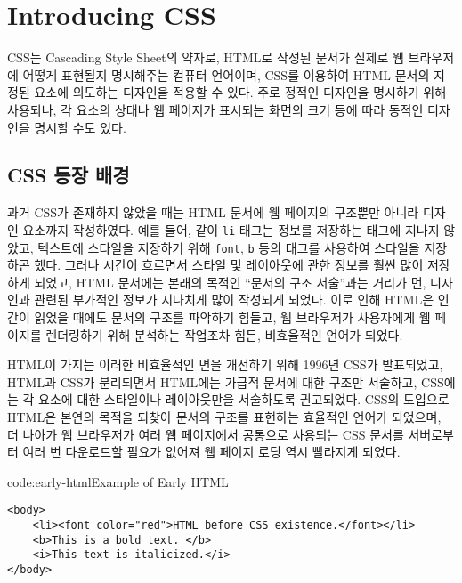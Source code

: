 \section{Introducing CSS} \label{sect:introducing-css}

CSS는 Cascading Style Sheet의 약자로, HTML로 작성된 문서가 실제로 웹 브라우저에 어떻게 표현될지 명시해주는 컴퓨터 언어이며, CSS를 이용하여 HTML 문서의 지정된 요소에 의도하는 디자인을 적용할 수 있다. 주로 정적인 디자인을 명시하기 위해 사용되나, 각 요소의 상태나 웹 페이지가 표시되는 화면의 크기 등에 따라 동적인 디자인을 명시할 수도 있다.

\subsection*{CSS 등장 배경}
과거 CSS가 존재하지 않았을 때는 HTML 문서에 웹 페이지의 구조뿐만 아니라 디자인 요소까지 작성하였다. 예를 들어, \과 같이 \texttt{li} 태그는 정보를 저장하는 태그에 지나지 않았고, 텍스트에 스타일을 저장하기 위해 \texttt{font}, \texttt{b} 등의 태그를 사용하여 스타일을 저장하곤 했다. 그러나 시간이 흐르면서 스타일 및 레이아웃에 관한 정보를 훨씬 많이 저장하게 되었고, HTML 문서에는 본래의 목적인 ``문서의 구조 서술''과는 거리가 먼, 디자인과 관련된 부가적인 정보가 지나치게 많이 작성되게 되었다. 이로 인해 HTML은 인간이 읽었을 때에도 문서의 구조를 파악하기 힘들고, 웹 브라우저가 사용자에게 웹 페이지를 렌더링하기 위해 분석하는 작업조차 힘든, 비효율적인 언어가 되었다.

HTML이 가지는 이러한 비효율적인 면을 개선하기 위해 1996년 CSS가 발표되었고, HTML과 CSS가 분리되면서 HTML에는 가급적 문서에 대한 구조만 서술하고, CSS에는 각 요소에 대한 스타일이나 레이아웃만을 서술하도록 권고되었다. CSS의 도입으로 HTML은 본연의 목적을 되찾아 문서의 구조를 표현하는 효율적인 언어가 되었으며, 더 나아가 웹 브라우저가 여러 웹 페이지에서 공통으로 사용되는 CSS 문서를 서버로부터 여러 번 다운로드할 필요가 없어져 웹 페이지 로딩 역시 빨라지게 되었다.

\begin{codeenv}{code:early-html}{Example of Early HTML}\begin{verbatim}
<body>
    <li><font color="red">HTML before CSS existence.</font></li>
    <b>This is a bold text. </b>
    <i>This text is italicized.</i>
</body>
\end{verbatim}
\end{codeenv}
